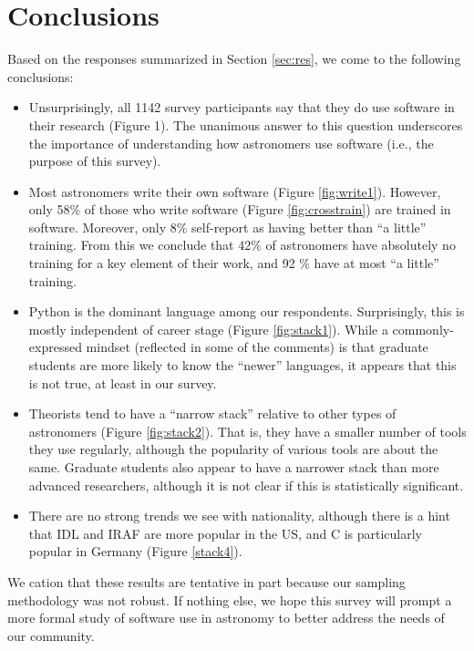 
\section{Conclusions}
\label{sec:conc}


Based on the responses summarized in Section \ref{sec:res}, we come to the following conclusions:



\begin{itemize}
\item Unsurprisingly, all 1142 survey participants say that they do use software in their research (Figure 1). The unanimous answer to this question underscores the importance of understanding how astronomers use software (i.e., the purpose of this survey).
\item Most astronomers write their own software (Figure \ref{fig:write1}).  However, only 58\% of those who write software (Figure \ref{fig:crosstrain}) are trained in software.  Moreover, only 8\% self-report as having better than ``a little'' training.  From this we conclude that 42\% of astronomers have absolutely no training for a key element of their work, and 92 \% have at most ``a little'' training.  
\item Python is the dominant language among our respondents.  Surprisingly, this is mostly independent of career stage (Figure \ref{fig:stack1}).  While a commonly-expressed mindset (reflected in some of the comments) is that graduate students are more likely to know the ``newer'' languages, it appears that this is not true, at least in our survey.
\item Theorists tend to have a ``narrow stack'' relative to other types of astronomers (Figure \ref{fig:stack2}).  That is, they have a smaller number of tools they use regularly, although the popularity of various tools are about the same.  Graduate students also appear to have a narrower stack than more advanced researchers, although it is not clear if this is statistically significant. 
\item There are no strong trends we see with nationality, although there is a hint that IDL and IRAF are more popular in the US, and C is particularly popular in Germany (Figure \ref{stack4}).
\end{itemize}

We cation that these results are tentative in part because our sampling methodology was not robust.  If nothing else, we hope this survey will prompt a more formal study of software use in astronomy to better address the needs of our community.

